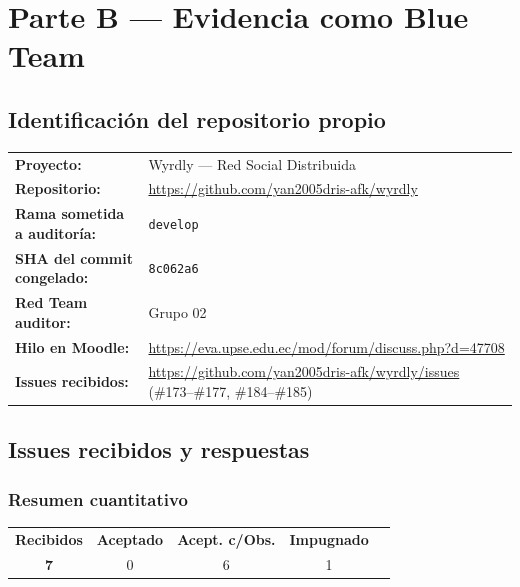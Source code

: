 \documentclass[10pt,a4paper]{article}
\newcommand{\code}[1]{\nolinkurl{#1}}
\newcommand{\badgeAceptado}{\colorbox{green!20}{\textcolor{green!60!black}{\textbf{\footnotesize Aceptado}}}}
\newcommand{\badgeAceptadoObs}{\colorbox{yellow!30}{\textcolor{brown!80!black}{\textbf{\footnotesize Acept. c/Obs.}}}}
\newcommand{\badgeImpugnado}{\colorbox{red!15}{\textcolor{red!70!black}{\textbf{\footnotesize Impugnado}}}}
\begin{document}
\section{\textcolor{blueteamcolor}{Parte B — Evidencia como Blue Team}}

\subsection{Identificación del repositorio propio}

\begin{tcolorbox}[colback=blue!4,colframe=blueteamcolor!40,arc=2mm]
\begin{tabular}{@{}p{4.5cm}p{10cm}@{}}
\textbf{Proyecto:} & Wyrdly — Red Social Distribuida \\
\textbf{Repositorio:} & \url{https://github.com/yan2005dris-afk/wyrdly} \\
\textbf{Rama sometida a auditoría:} & \code{develop} \\
\textbf{SHA del commit congelado:} & \code{8c062a6} \\
\textbf{Red Team auditor:} & Grupo 02 \\
\textbf{Hilo en Moodle:} & \url{https://eva.upse.edu.ec/mod/forum/discuss.php?d=47708} \\
\textbf{Issues recibidos:} & \url{https://github.com/yan2005dris-afk/wyrdly/issues} (\#173--\#177, \#184--\#185) \\
\end{tabular}
\end{tcolorbox}

\subsection{Issues recibidos y respuestas}

\subsubsection{Resumen cuantitativo}

\begin{tcolorbox}[colback=lightgray!50,colframe=upseblue!30,arc=2mm]
\centering
\begin{tabular}{ccccc}
\textbf{Recibidos} & \badgeAceptado & \badgeAceptadoObs & \badgeImpugnado & \\[4pt]
\textbf{7} & 0 & 6 & 1 & \\
\end{tabular}
\end{tcolorbox}
\end{document}

